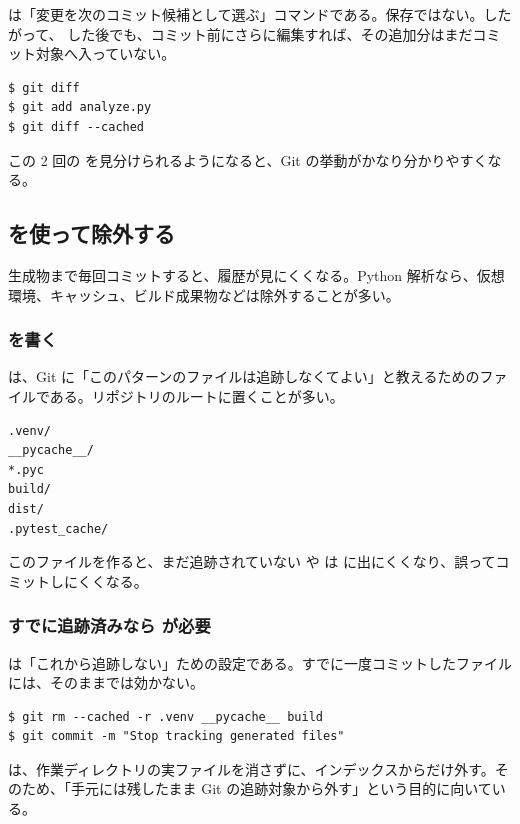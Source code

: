  は「変更を次のコミット候補として選ぶ」コマンドである。保存ではない。したがって、 した後でも、コミット前にさらに編集すれば、その追加分はまだコミット対象へ入っていない。

\begin{lstlisting}[numbers=none, xleftmargin=2\zw]
$ git diff
$ git add analyze.py
$ git diff --cached
\end{lstlisting}

この 2 回の  を見分けられるようになると、Git の挙動がかなり分かりやすくなる。

\subsection{ を使って除外する}

生成物まで毎回コミットすると、履歴が見にくくなる。Python 解析なら、仮想環境、キャッシュ、ビルド成果物などは除外することが多い。

\subsubsection{ を書く}

 は、Git に「このパターンのファイルは追跡しなくてよい」と教えるためのファイルである。リポジトリのルートに置くことが多い。

\begin{lstlisting}[numbers=none, xleftmargin=2\zw]
.venv/
__pycache__/
*.pyc
build/
dist/
.pytest_cache/
\end{lstlisting}

このファイルを作ると、まだ追跡されていない  や  は  に出にくくなり、誤ってコミットしにくくなる。

\subsubsection{すでに追跡済みなら  が必要}

 は「これから追跡しない」ための設定である。すでに一度コミットしたファイルには、そのままでは効かない。

\begin{lstlisting}[numbers=none, xleftmargin=2\zw]
$ git rm --cached -r .venv __pycache__ build
$ git commit -m "Stop tracking generated files"
\end{lstlisting}

 は、作業ディレクトリの実ファイルを消さずに、インデックスからだけ外す。そのため、「手元には残したまま Git の追跡対象から外す」という目的に向いている。


